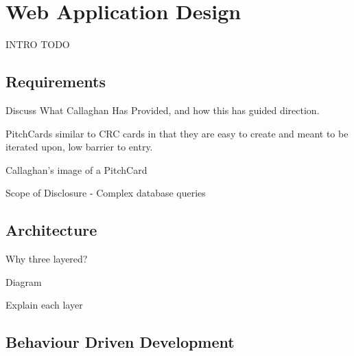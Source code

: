 \chapter{Web Application Design}
INTRO TODO

\section{Requirements}
Discuss What Callaghan Has Provided, and how this has guided direction.

PitchCards similar to CRC cards in that they are easy to create and meant to be iterated upon, low barrier to entry.

Callaghan's image of a PitchCard

Scope of Disclosure - Complex database queries

\section{Architecture}

Why three layered?

Diagram

Explain each layer

\section{Behaviour Driven Development}

